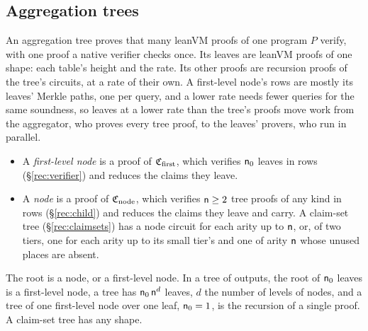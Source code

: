 \subsection{Aggregation trees}\label{rec:tree}

An aggregation tree proves that many leanVM proofs of one program $P$ verify, with one proof a native verifier checks once. Its leaves are leanVM proofs of one shape: each table's height and the rate. Its other proofs are recursion proofs of the tree's circuits, at a rate of their own. A first-level node's rows are mostly its leaves' Merkle paths, one per query, and a lower rate needs fewer queries for the same soundness, so leaves at a lower rate than the tree's proofs move work from the aggregator, who proves every tree proof, to the leaves' provers, who run in parallel.
\begin{itemize}[itemsep=1pt,topsep=3pt]
\item A \emph{first-level node} is a proof of $\mathfrak{C}_{\mathrm{first}}$, which verifies $\mathsf{n}_0$ leaves in rows (\S\ref{rec:verifier}) and reduces the claims they leave.
\item A \emph{node} is a proof of $\mathfrak{C}_{\mathrm{node}}$, which verifies $\mathsf{n}\ge2$ tree proofs of any kind in rows (\S\ref{rec:child}) and reduces the claims they leave and carry. A claim-set tree (\S\ref{rec:claimsets}) has a node circuit for each arity up to $\mathsf{n}$, or, of two tiers, one for each arity up to its small tier's and one of arity $\mathsf{n}$ whose unused places are absent.
\end{itemize}
The root is a node, or a first-level node. In a tree of outputs, the root of $\mathsf{n}_0$ leaves is a first-level node, a tree has $\mathsf{n}_0\,\mathsf{n}^d$ leaves, $d$ the number of levels of nodes, and a tree of one first-level node over one leaf, $\mathsf{n}_0=1$, is the recursion of a single proof. A claim-set tree has any shape.

